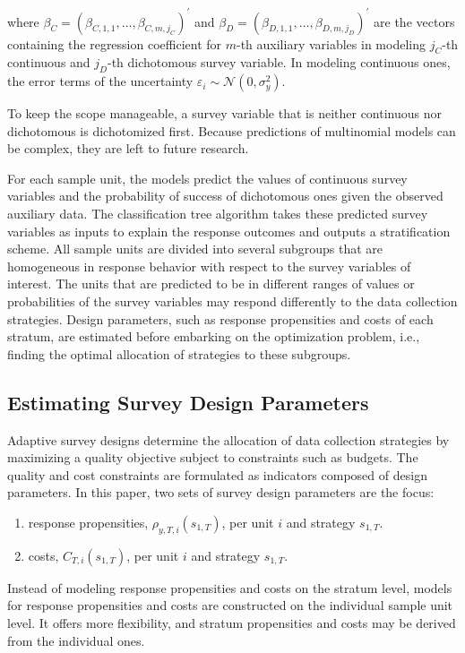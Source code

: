 \documentclass[12pt]{article}
\begin{document}
where $\beta_C=(\beta_{C,1,1},\dots,\beta_{C,m,j_C})^{'}$ and $\beta_D=(\beta_{D,1,1},\dots,\beta_{D,m,j_D})^{'}$ are the vectors containing the regression coefficient for $m$-th auxiliary variables in modeling $j_C$-th continuous and $j_D$-th dichotomous survey variable. In modeling continuous ones, the error terms of the uncertainty $\varepsilon_{i} \sim \mathcal{N}\left(0, \sigma^2_y\right)$.

To keep the scope manageable, a survey variable that is neither continuous nor dichotomous is dichotomized first.
Because predictions of multinomial models can be complex, they are left to future research.

For each sample unit, the models predict the values of continuous survey variables and the probability of success of dichotomous ones given the observed auxiliary data.
The classification tree algorithm takes these predicted survey variables as inputs to explain the response outcomes and outputs a stratification scheme.
All sample units are divided into several subgroups that are homogeneous in response behavior with respect to the survey variables of interest.
The units that are predicted to be in different ranges of values or probabilities of the survey variables may respond differently to the data collection strategies.
Design parameters, such as response propensities and costs of each stratum, are estimated before embarking on the optimization problem, i.e., finding the optimal allocation of strategies to these subgroups.


\subsection{Estimating Survey Design Parameters}
\label{subsec:estimating-survey-design-parameters}

Adaptive survey designs determine the allocation of data collection strategies by maximizing a quality objective subject to constraints such as budgets.
The quality and cost constraints are formulated as indicators composed of design parameters. In this paper, two sets of survey design parameters are the focus:
\begin{enumerate}
	\item response propensities, $\rho_{y,T,i}(s_{1,T})$, per unit $i$ and strategy $s_{1,T}$.
	\item costs, $C_{T,i}(s_{1,T})$, per unit $i$ and strategy $s_{1,T}$.
\end{enumerate}
Instead of modeling response propensities and costs on the stratum level, models for response propensities and costs are constructed on the individual sample unit level.
It offers more flexibility, and stratum propensities and costs may be derived from the individual ones.
\end{document}
